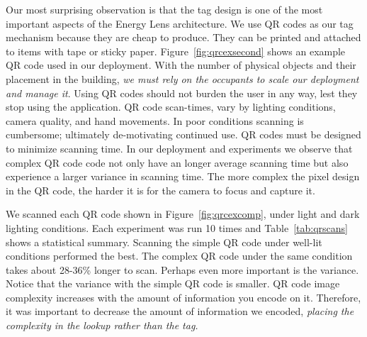 Our most surprising observation is that the tag design is one of the most important aspects of the Energy Lens architecture. 
We use QR codes as our tag mechanism because they are cheap to produce.  They can be printed and attached to items with tape or sticky paper.  
Figure~\ref{fig:qrcexsecond} shows an example QR code used in our deployment.  
With the number of physical objects and their placement in the building, \emph{we must rely on the occupants
to scale our deployment and manage it}.  Using QR codes should not burden the user in any way, lest they stop using the application.
QR code scan-times, vary by lighting conditions, 
camera quality, and hand movements.  In poor conditions scanning is cumbersome; ultimately de-motivating continued use.  
QR codes must be designed to minimize scanning time.  In our deployment and experiments we observe
that complex QR code code not only have an longer average scanning time but also experience a larger variance in scanning time.  
The more complex the pixel design in the QR code, the harder it is for the camera to focus and capture it. 

We scanned each QR code shown in Figure~\ref{fig:qrcexcomp}, under light and dark lighting conditions.  
Each experiment was run 10 times and Table~\ref{tab:qrscans} shows a statistical summary.  Scanning the simple QR code under well-lit 
conditions performed the best.  The complex QR code under  the same condition takes about 28-36\% longer to scan.
Perhaps even more important is the variance.  Notice that the variance with the simple QR code is smaller.
QR code image complexity increases with the amount of information you encode on it.  Therefore, it was important to decrease the
amount of information we encoded, \emph{placing the complexity in the lookup rather than the tag.}

